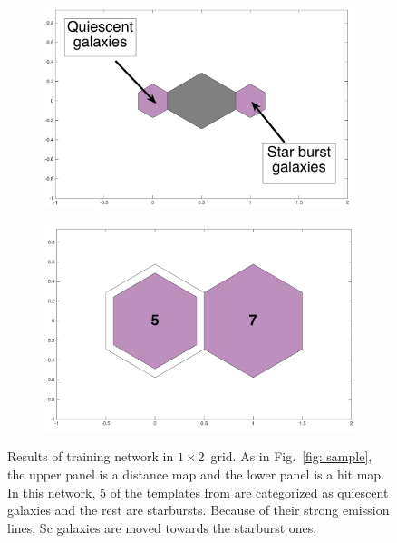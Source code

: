             \begin{figure}
                \begin{subfigure}[b]{0.5\textwidth}
                    \centering
                    \includegraphics[width=\textwidth]{images0.01/1d/dist_1_by_2.png}
                \end{subfigure}
                \hfill
                \begin{subfigure}[b]{0.5\textwidth}
                     \includegraphics[width=\textwidth]{images0.01/1d/hit_t_1_by_2.png}
                \end{subfigure}
                \caption{Results of training network in $1\times2$~grid. As in Fig.~\ref{fig: sample}, the upper panel is a distance map and the lower panel is a hit map. In this network, 5 of the templates from  are categorized as quiescent galaxies and the rest are starbursts. Because of their strong emission lines, Sc galaxies are moved towards the starburst ones.}
                 \label{fig: 1by2T}
            \end{figure}
        
